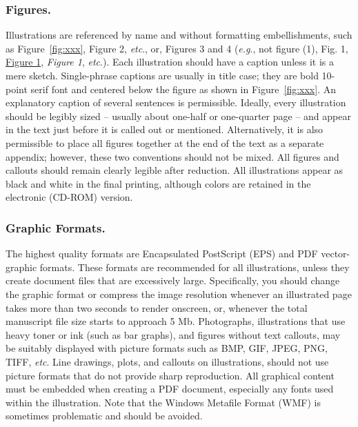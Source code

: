 \documentclass[letterpaper, preprint, paper,11pt]{AAS}	%
\begin{document}
\subsubsection{Figures.}   
Illustrations are referenced by name and without formatting embellishments, such as Figure~\ref{fig:xxx}, Figure 2, \emph{etc}., or, Figures 3 and 4 (\emph{e.g}., not figure (1), Fig. 1, \underline{Figure 1}, \emph{Figure 1}, \emph{etc}.). Each illustration should have a caption unless it is a mere sketch. Single-phrase captions are usually in title case; they are bold 10-point serif font and centered below the figure as shown in Figure~\ref{fig:xxx}. An explanatory caption of several sentences is permissible. Ideally, every illustration should be legibly sized -- usually about one-half or one-quarter page -- and appear in the text just before it is called out or mentioned. Alternatively, it is also permissible to place all figures together at the end of the text as a separate appendix; however, these two conventions should not be mixed. All figures and callouts should remain clearly legible after reduction. All illustrations appear as black and white in the final printing, although colors are retained in the electronic (CD-ROM) version.


\subsubsection{Graphic Formats.} 
The highest quality formats are Encapsulated PostScript (EPS) and PDF vector-graphic formats. These formats are recommended for all illustrations, unless they create document files that are excessively large. Specifically, you should change the graphic format or compress the image resolution whenever an illustrated page takes more than two seconds to render onscreen, or, whenever the total manuscript file size starts to approach 5 Mb. Photographs, illustrations that use heavy toner or ink (such as bar graphs), and figures without text callouts, may be suitably displayed with picture formats such as BMP, GIF, JPEG, PNG, TIFF, \emph{etc}. Line drawings, plots, and callouts on illustrations, should not use picture formats that do not provide sharp reproduction. All graphical content must be embedded when creating a PDF document, especially any fonts used within the illustration. Note that the Windows Metafile Format (WMF) is sometimes problematic and should be avoided.
\end{document}
